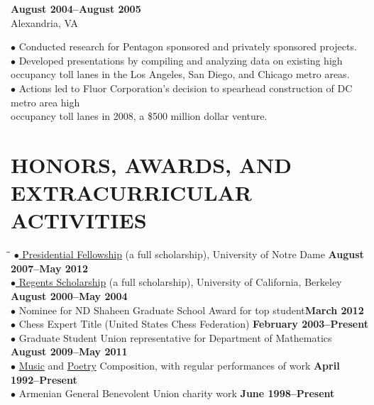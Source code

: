 \documentclass{resume}
\begin{document}
\begin{resume}
\begin{tabbing}
	\textbf{August 2004--August 2005}\\
		\>Alexandria, VA
	\end{tabbing}\vspace{-15pt}
	$\bullet$ Conducted research for Pentagon sponsored and privately
	sponsored projects. 
	\\ 
	$\bullet$ Developed presentations by compiling and
	analyzing data on existing high occupancy toll lanes in 
	\phantom{$\bullet$} the Los
	Angeles, San Diego, and
	Chicago metro areas.  
	\\
	$\bullet$ Actions led to Fluor Corporation's decision to
	spearhead construction of DC metro area high \\
	\phantom{$\bullet$} occupancy toll lanes
	in 2008, a \$500
	million dollar venture.

	\section{HONORS, AWARDS, AND EXTRACURRICULAR ACTIVITIES} 
	\vspace{-0.1in}
	\begin{tabbing}
	  \hspace{2.3in}\= \hspace{2.6in}\= \kill
    \href{http://graduateschool.nd.edu/admissions/financial-support/prestigious-fellowships/presidential-fellowships-arthur-j-schmitt-fellowships/}{$\bullet$ Presidential
    Fellowship} (a full scholarship), University of Notre Dame \>\> \textbf{August 2007--May 2012} \\
    \href{http://students.berkeley.edu/finaid/undergraduates/types_regents.htm}{$\bullet$ Regents
    Scholarship} (a full scholarship), University of California, 
    Berkeley \>\> \textbf{August 2000--May 2004} \\
$\bullet$ Nominee for ND Shaheen Graduate School Award for top student\>\>\textbf{March 2012}
\\
    $\bullet$ Chess Expert Title (United States Chess Federation) \>\>\textbf{February 2003--Present}
    \\
 $\bullet$ Graduate Student Union representative for Department of Mathematics \>\>\textbf{August 2009--May 2011}\\
    $\bullet$ \href{http://davidkarapetyan.com/music.php}{Music} and
    \href{http://davidkarapetyan.com/poetry.php}{Poetry} Composition, with regular
    performances of work \>\> \textbf{April 1992--Present}\\
    $\bullet$ Armenian General Benevolent Union charity work \>\> \textbf{June 1998--Present}\\
      \end{tabbing}

\end{resume}
\end{document}
